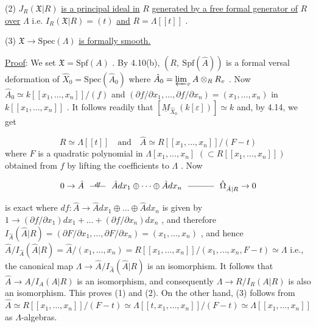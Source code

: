 (2)  $J_R(\mathfrak{X}|R)$  \underline{is a principal ideal in}  $R$  \underline{generated by a free formal generator of}  $R$  \underline{over}  $\Lambda$  i.e.  $I_R(\mathfrak{X}|R) = (t)$  \underline{and}  $R = \Lambda[[t]]$  .

(3)  $\mathfrak{X} \rightarrow \mathrm{Spec}(\Lambda)$  \underline{is formally smooth.}

\underline{Proof}:  We set  $\mathfrak{X} = \mathrm{Spf}(A)$  . By 4.10(b),  $(R,\ \mathrm{Spf}(\hat{A}))$  is a formal versal deformation of  $\hat{X}_0 = \mathrm{Spec}(\hat{A}_0)$  where  $\hat{A}_0 = \varprojlim_{v} A \otimes_R R_v$  . Now  $\hat{A}_0 \simeq k[[x_1,\dots,x_n]]/(f)$  and  $(\partial f/\partial x_1,\dots,\partial f/\partial x_n) = (x_1,\dots,x_n)$  in $k[[x_1,\dots,x_n]]$  . It follows readily that  $[\underline{M}_{\hat{X}_0}(k[\varepsilon])] \simeq k$  and, by 4.14, we get

\begin{equation*}
R \simeq \Lambda[[t]] \quad\text{and}\quad \hat{A} \simeq R[[x_1,\dots,x_n]]/(F - t)
\end{equation*}
where  $F$  is a quadratic polynomial in  $\Lambda[x_1,\dots,x_n]$  $(\subset R[[x_1,\dots,x_n]])$ obtained from  $f$  by lifting the coefficients to  $\Lambda$  . Now

\begin{equation*}
0 \rightarrow \hat{A} \ \overset{df}{\relbar\joinrel\relbar\joinrel\relbar}\ \hat{A}dx_1 \oplus \dots \oplus \hat{A}dx_n \ \relbar\joinrel\relbar\joinrel\relbar\joinrel\relbar\joinrel\relbar\ \hat{\Omega}_{\hat{A}|R} \rightarrow 0 
\end{equation*}


 is exact where  $df : \hat{A} \rightarrow \hat{A}dx_1 \oplus \dots \oplus \hat{A}dx_n$  is given by $1 \rightarrow (\partial f/\partial x_1)dx_1 + \dots + (\partial f/\partial x_n)dx_n$  , and therefore $I_{\hat{A}}(\hat{A}|R) = (\partial F/\partial x_1,\dots,\partial F/\partial x_n) = (x_1,\dots,x_n)$  , and hence $\hat{A}/I_{\hat{A}}(\hat{A}|R) = \hat{A}/(x_1,\dots,x_n) = R[[x_1,\dots,x_n]]/(x_1,\dots,x_n,F - t) \simeq \Lambda$ i.e., the canonical map  $\Lambda \rightarrow \hat{A}/I_{\hat{A}}(\hat{A}|R)$  is an isomorphism. It follows that $\hat{A} \rightarrow A/I_A(A|R)$  is an isomorphism, and consequently  $\Lambda \rightarrow R/I_R(A|R)$  is also an isomorphism. This proves (1) and (2). On the other hand, (3) follows from $\hat{A} \simeq R[[x_1,\dots,x_n]]/(F - t) \simeq \Lambda[[t,x_1,\dots,x_n]]/(F - t) \simeq \Lambda[[x_1,\dots,x_n]]$   as $\Lambda$-algebras.

